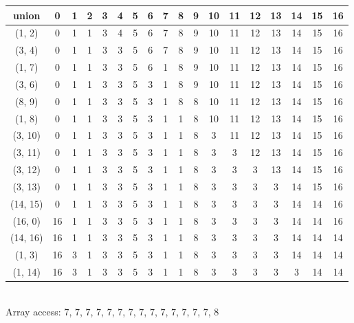 \documentclass{article}\usepackage{amsmath,amssymb,amsthm,tikz,tkz-graph,color,chngpage,soul,hyperref,csquotes,graphicx,floatrow}\newcommand*{\QEDB}{\hfill\ensuremath{\square}}\newtheorem*{prop}{Proposition}\renewcommand{\theenumi}{\alph{enumi}}\usepackage[shortlabels]{enumitem}\usepackage[nobreak=true]{mdframed}\usetikzlibrary{matrix,calc}\MakeOuterQuote{"}\usepackage[margin=0.75in]{geometry} \newtheorem{theorem}{Theorem}
\begin{document}
\begin{mdframed}
\begin{enumerate}[a.]
\begin{tabular}{|c|c|c|c|c|c|c|c|c|c|c|c|c|c|c|c|c|c|}
\hline
union & 0 &1 & 2 & 3 & 4 & 5 & 6 & 7 & 8 & 9 & 10 & 11 & 12 & 13 & 14 & 15 & 16 \\
\hline
(1, 2) & 0 & 1 & 1 & 3 & 4 & 5 & 6 & 7 & 8 & 9 & 10 & 11 & 12 & 13 & 14 & 15 & 16 \\
\hline
(3, 4) & 0 & 1 & 1 & 3 & 3 & 5 & 6 & 7 & 8 & 9 & 10 & 11 & 12 & 13 & 14 & 15 & 16 \\
\hline
(1, 7) & 0 & 1 & 1 & 3 & 3 & 5 & 6 & 1 & 8 & 9 & 10 & 11 & 12 & 13 & 14 & 15 & 16 \\
\hline
(3, 6) & 0 & 1 & 1 & 3 & 3 & 5 & 3 & 1 & 8 & 9 & 10 & 11 & 12 & 13 & 14 & 15 & 16 \\
\hline
(8, 9) & 0 & 1 & 1 & 3 & 3 & 5 & 3 & 1 & 8 & 8 & 10 & 11 & 12 & 13 & 14 & 15 & 16 \\
\hline
(1, 8) & 0 & 1 & 1 & 3 & 3 & 5 & 3 & 1 & 1 & 8 & 10 & 11 & 12 & 13 & 14 & 15 & 16 \\
\hline
(3, 10) & 0 & 1 & 1 & 3 & 3 & 5 & 3 & 1 & 1 & 8 & 3 & 11 & 12 & 13 & 14 & 15 & 16 \\
\hline
(3, 11) & 0 & 1 & 1 & 3 & 3 & 5 & 3 & 1 & 1 & 8 & 3 & 3 & 12 & 13 & 14 & 15 & 16 \\
\hline
(3, 12) & 0 & 1 & 1 & 3 & 3 & 5 & 3 & 1 & 1 & 8 & 3 & 3 & 3 & 13 & 14 & 15 & 16 \\
\hline
(3, 13) & 0 & 1 & 1 & 3 & 3 & 5 & 3 & 1 & 1 & 8 & 3 & 3 & 3 & 3 & 14 & 15 & 16 \\
\hline
(14, 15) & 0 & 1 & 1 & 3 & 3 & 5 & 3 & 1 & 1 & 8 & 3 & 3 & 3 & 3 & 14 & 14 & 16 \\
\hline
(16, 0) & 16 & 1 & 1 & 3 & 3 & 5 & 3 & 1 & 1 & 8 & 3 & 3 & 3 & 3 & 14 & 14 & 16 \\
\hline
(14, 16) & 16 & 1 & 1 & 3 & 3 & 5 & 3 & 1 & 1 & 8 & 3 & 3 & 3 & 3 & 14 & 14 & 14 \\
\hline
(1, 3) & 16 & 3 & 1 & 3 & 3 & 5 & 3 & 1 & 1 & 8 & 3 & 3 & 3 & 3 & 14 & 14 & 14 \\
\hline
(1, 14) & 16 & 3 & 1 & 3 & 3 & 5 & 3 & 1 & 1 & 8 & 3 & 3 & 3 & 3 & 3 & 14 & 14 \\
\hline
\end{tabular}
\\ Array access: $7$, $7$, $7$, $7$, $7$, $7$, $7$, $7$, $7$, $7$, $7$, $7$, $7$, $7$, $8$\\
                          
\end{enumerate}
\end{mdframed}
\end{document}
